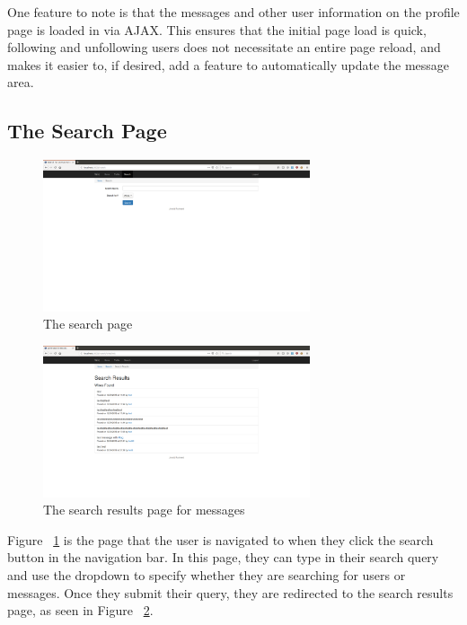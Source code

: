 One feature to note is that the messages and other user information on
the profile page is loaded in via AJAX. This ensures that the initial
page load is quick, following and unfollowing users does not necessitate
an entire page reload, and makes it easier to, if desired, add a feature
to automatically update the message area.

\subsection{The Search Page}

\begin{figure}[H]
	\centering
	\includegraphics[width=0.7\textwidth]{final_report/pics/searchBase.png}
	\caption{The search page}
	\label{fig:wireSearch}
\end{figure}

\begin{figure}[H]
	\centering
	\includegraphics[width=0.7\textwidth]{final_report/pics/searchWire.png}
	\caption{The search results page for messages}
	\label{fig:wireSearchWire}
\end{figure}

Figure ~\ref{fig:wireSearch} is the page that the user is navigated to when they
click the search button in the navigation bar. In this page, they can type in
their search query and use the dropdown to specify whether they are searching
for users or messages. Once they submit their query, they are redirected to
the search results page, as seen in Figure ~\ref{fig:wireSearchWire}.

